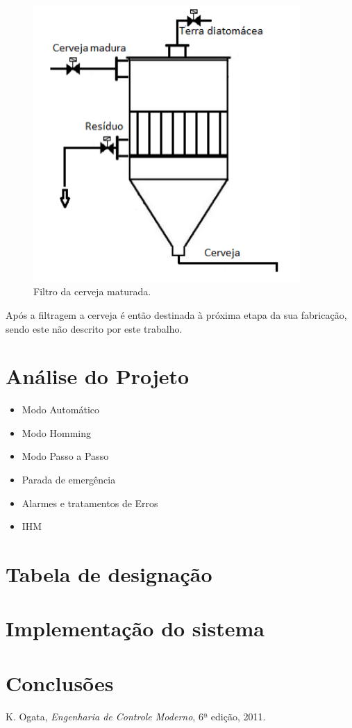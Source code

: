 \documentclass[12pt]{article}
\begin{document}
	\begin{figure}[H]
		\centering
		\includegraphics [width=4in]{filtro.png}
		\caption {Filtro da cerveja maturada.}
		\label{fig:corrente}
	\end{figure}
	
	\begin{par}
		Após a filtragem a cerveja é então destinada à próxima etapa da sua fabricação, sendo este não descrito por este trabalho.
	\end{par}
	
	
	\section {Análise do Projeto}
	\begin {itemize}
	\item Modo Automático
	
	\item Modo Homming
	
	\item Modo Passo a Passo
	
	\item Parada de emergência
	
	\item Alarmes e tratamentos de Erros
	
	\item IHM
\end{itemize}

\section {Tabela de designação}

\section {Implementação do sistema}

\section {Conclusões}

\begin{thebibliography}{5}
	
	 K. Ogata, \emph{Engenharia de Controle Moderno}, 6ª edição, 2011.
	
\end{thebibliography}
\end{document}
